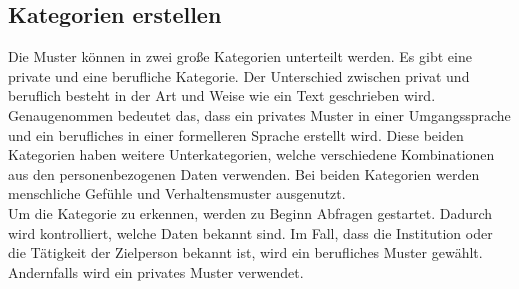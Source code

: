 	\subsection{Kategorien erstellen}
	Die Muster können in zwei große Kategorien unterteilt werden. Es gibt eine private und eine berufliche Kategorie. Der Unterschied zwischen privat und beruflich besteht in der Art und Weise wie ein Text geschrieben wird. Genaugenommen bedeutet das, dass ein privates Muster in einer Umgangssprache und ein berufliches in einer formelleren Sprache erstellt wird. Diese beiden Kategorien haben weitere Unterkategorien, welche verschiedene Kombinationen aus den personenbezogenen Daten verwenden. Bei beiden Kategorien werden menschliche Gefühle und Verhaltensmuster ausgenutzt.\\
	Um die Kategorie zu erkennen, werden zu Beginn Abfragen gestartet. Dadurch wird kontrolliert, welche Daten bekannt sind. Im Fall, dass die Institution oder die Tätigkeit der Zielperson bekannt ist, wird ein berufliches Muster gewählt. Andernfalls wird ein privates Muster verwendet.
	
